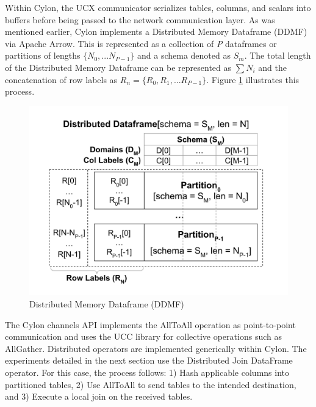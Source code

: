 Within Cylon, the UCX communicator serializes tables, columns, and scalars into buffers before being passed to the network communication layer.  As was mentioned earlier, Cylon implements a Distributed Memory Dataframe (DDMF) via Apache Arrow. This is represented as a collection of \textit{P} dataframes or partitions of lengths $\{ N_0,...N_{P-1}\}$ and a schema denoted as $S_m$.  The total length of the Distributed Memory Dataframe can be represented as $\sum{N_i}$ and the concatenation of row labels as $R_n=\{R_0, R_1, ... R_{P-1}  \}$.  Figure \ref{fig:distdataframe} illustrates this process.

\begin{figure}[ht]
    \begin{center}
    \includegraphics[width=\linewidth]{source/Figure/distDataframe.png}
    \end{center}
    \caption{Distributed Memory Dataframe (DDMF)\cite{pererathesis}}
    \label{fig:distdataframe}
\end{figure}

The Cylon channels API implements the AllToAll operation as point-to-point communication and uses the UCC library for  collective operations such as AllGather.  Distributed operators are implemented generically within Cylon.  The experiments detailed in the next section use the Distributed Join DataFrame operator.  For this case, the process follows: 1) Hash applicable columns into partitioned tables, 2) Use AllToAll to send tables to the intended destination, and 3) Execute a local join on the received tables\cite{shan2022hybrid}.

